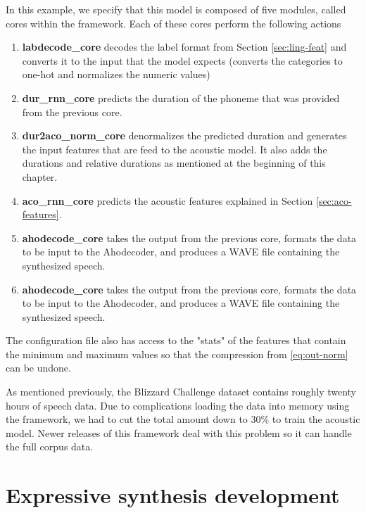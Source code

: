 In this example, we specify that this model is composed of five modules, called cores within the framework. Each of these cores perform the following actions

\begin{enumerate}
    \item \textbf{labdecode\_core} decodes the label format from Section \ref{sec:ling-feat} and converts it to the input that the model expects (converts the categories to one-hot and normalizes the numeric values)
    \item \textbf{dur\_rnn\_core} predicts the duration of the phoneme that was provided from the previous core.
    \item \textbf{dur2aco\_norm\_core} denormalizes the predicted duration and generates the input features that are feed to the acoustic model. It also adds the durations and relative durations as mentioned at the beginning of this chapter.
    \item \textbf{aco\_rnn\_core} predicts the acoustic features explained in Section \ref{sec:aco-features}.
    \item \textbf{ahodecode\_core} takes the output from the previous core, formats the data to be input to the Ahodecoder, and produces a WAVE file containing the synthesized speech.
    \item \textbf{ahodecode\_core} takes the output from the previous core, formats the data to be input to the Ahodecoder, and produces a WAVE file containing the synthesized speech.
\end{enumerate}

The configuration file also has access to the "stats" of the features that contain the minimum and maximum values so that the compression from \ref{eq:out-norm} can be undone.

As mentioned previously, the Blizzard Challenge dataset contains roughly twenty hours of speech data. Due to complications loading the data into memory using the framework, we had to cut the total amount down to 30\% to train the acoustic model. Newer releases of this framework deal with this problem so it can handle the full corpus data.

\section{Expressive synthesis development}

